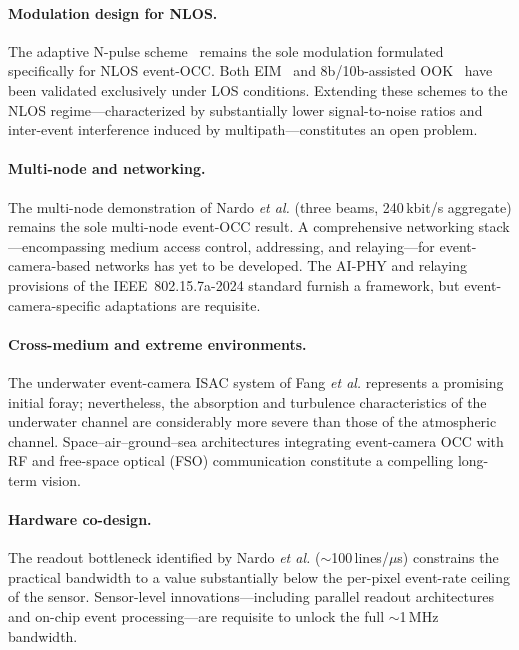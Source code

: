 \documentclass[10pt,a4paper]{article}
\begin{document}
\paragraph{Modulation design for NLOS.}
The adaptive N-pulse scheme~\cite{nishar2025nlosneuromorphic} remains
the sole modulation formulated specifically for NLOS event-OCC. Both
EIM~\cite{sumino2025eim} and 8b/10b-assisted
OOK~\cite{nardo2026longrange} have been validated exclusively under LOS
conditions. Extending these schemes to the NLOS regime---characterized
by substantially lower signal-to-noise ratios and inter-event
interference induced by multipath---constitutes an open problem.

\paragraph{Multi-node and networking.}
The multi-node demonstration of Nardo \emph{et al.}
\cite{nardo2026longrange} (three beams, 240\,kbit/s aggregate) remains
the sole multi-node event-OCC result. A comprehensive networking
stack---encompassing medium access control, addressing, and
relaying---for event-camera-based networks has yet to be developed. The
AI-PHY and relaying provisions of the IEEE~802.15.7a-2024 standard
furnish a framework, but event-camera-specific adaptations are
requisite.

\paragraph{Cross-medium and extreme environments.}
The underwater event-camera ISAC system of Fang \emph{et al.}
\cite{fang2026underwater} represents a promising initial foray;
nevertheless, the absorption and turbulence characteristics of the
underwater channel are considerably more severe than those of the
atmospheric channel. Space--air--ground--sea architectures integrating
event-camera OCC with RF and free-space optical (FSO) communication
constitute a compelling long-term vision.

\paragraph{Hardware co-design.}
The readout bottleneck identified by Nardo \emph{et al.}
\cite{nardo2026longrange} ($\sim$100\,lines/$\mu$s) constrains the
practical bandwidth to a value substantially below the per-pixel
event-rate ceiling of the sensor. Sensor-level innovations---including
parallel readout architectures and on-chip event processing---are
requisite to unlock the full $\sim$1\,MHz bandwidth.
\end{document}
